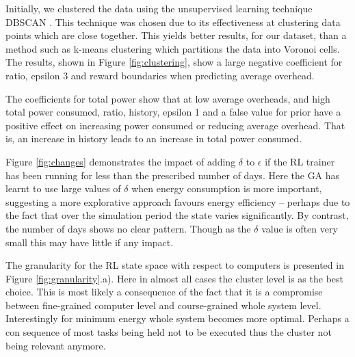 \documentclass[10pt, conference, compsocconf]{IEEEtran}
\begin{document}
Initially, we clustered the data using the unsupervised learning technique DBSCAN \cite{Ester1996}. This technique was chosen due to its effectiveness at clustering data points which are close together. This yields better results, for our dataset, than a method such as k-means clustering which partitions the data into Voronoi cells. 
The results, shown in Figure \ref{fig:clustering}, show a large negative coefficient for ratio, epsilon 3 and reward boundaries when predicting average overhead.

The coefficients for total power show that at low average overheads, and high total power consumed, ratio, history, epsilon 1 and a false value for prior have a positive effect on increasing power consumed or reducing average overhead. That is, an increase in history leads to an increase in total power consumed.
%







Figure \ref{fig:changes} demonstrates the impact of adding $\delta$ to $\epsilon$ if the RL trainer has been running for less than the prescribed number of days. Here the GA has learnt to use large values of $\delta$ when energy consumption is more important, suggesting a more explorative approach favours energy efficiency -- perhaps due to the fact that over the simulation period the state varies significantly. By contrast, the number of days shows no clear pattern. Though as the $\delta$ value is often very small this may have little if any impact.


The granularity for the RL state space with respect to computers is presented in Figure \ref{fig:granularity}.a). Here in almost all cases the cluster level is as the best choice. This is most likely a consequence of the fact that it is a compromise between fine-grained computer level and course-grained whole system level. Interestingly for minimum energy whole system becomes more optimal. {\color{green} Perhaps a con		sequence of most tasks being held not to be executed thus the cluster not being relevant anymore.}
\end{document}
